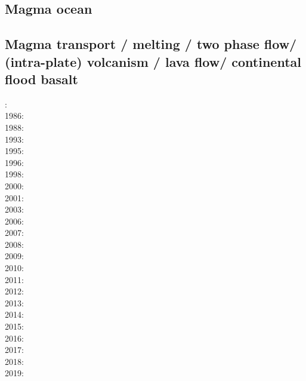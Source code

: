 \subsection*{Magma ocean}

\cite{maha15}



\subsection*{Magma transport / melting / two phase flow/ (intra-plate) volcanism / lava flow/ 
continental flood basalt}

: \cite{scst84}\cite{mcke84}\\
1986: \cite{scst86}\\
1988: \cite{scot88}\\
1993: \cite{spie93}\\
1995: \cite{bisc95}\\
1996: \cite{laki96}\\
1998: \cite{rabg98}\\
2000: \cite{elha00}\\
2001: \cite{bers01}\\
2003: \cite{beri03}\\
2006: \cite{onmm06}\\
2007: \cite{srrb07}\cite{mohb07}\cite{elki07}\cite{copb07}\\
2008: \cite{hets08}\cite{hest08}\\
2009: \cite{bavi09}\\
2010: \cite{baiv10}\cite{habl10}\cite{cows10}\\
2011: \cite{baiv11}\cite{zhgy11}\cite{zhgh11}\cite{bics11}\\
2012: \cite{yatd12}\cite{kasc12b}\cite{ullc12}\\
2013: \cite{kemk13}\cite{mofm13}\\
2014: \cite{kast14}\\
2015: \cite{tukb15}\cite{moba15}\\
2016: \cite{keka16}\\
2017: \cite{dilc17}\\
2018: \cite{lorg18}\\
2019: \cite{dagg19}

